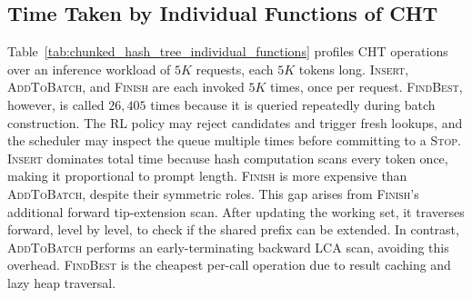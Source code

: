 \subsection{Time Taken by Individual Functions of CHT}
\label{subsec:time_taken_individual_functions_chunked_hash_tree}
Table~\ref{tab:chunked_hash_tree_individual_functions} profiles CHT operations over an inference workload of $5K$ requests, each $5K$ tokens long. \textsc{Insert}, \textsc{AddToBatch}, and \textsc{Finish} are each invoked $5K$ times, once per request. \textsc{FindBest}, however, is called $26{,}405$ times because it is queried repeatedly during batch construction. The RL policy may reject candidates and trigger fresh lookups, and the scheduler may inspect the queue multiple times before committing to a \textsc{Stop}. \textsc{Insert} dominates total time because hash computation scans every token once, making it proportional to prompt length. \textsc{Finish} is more expensive than \textsc{AddToBatch}, despite their symmetric roles. This gap arises from \textsc{Finish}'s additional forward tip-extension scan. After updating the working set, it traverses forward, level by level, to check if the shared prefix can be extended. In contrast, \textsc{AddToBatch} performs an early-terminating backward LCA scan, avoiding this overhead. \textsc{FindBest} is the cheapest per-call operation due to result caching and lazy heap traversal.

\begin{table}[t]
\centering
\small
{}
\caption{Time taken by individual functions of CHT}
\label{tab:chunked_hash_tree_individual_functions}
\vspace{-20pt}
\end{table}


